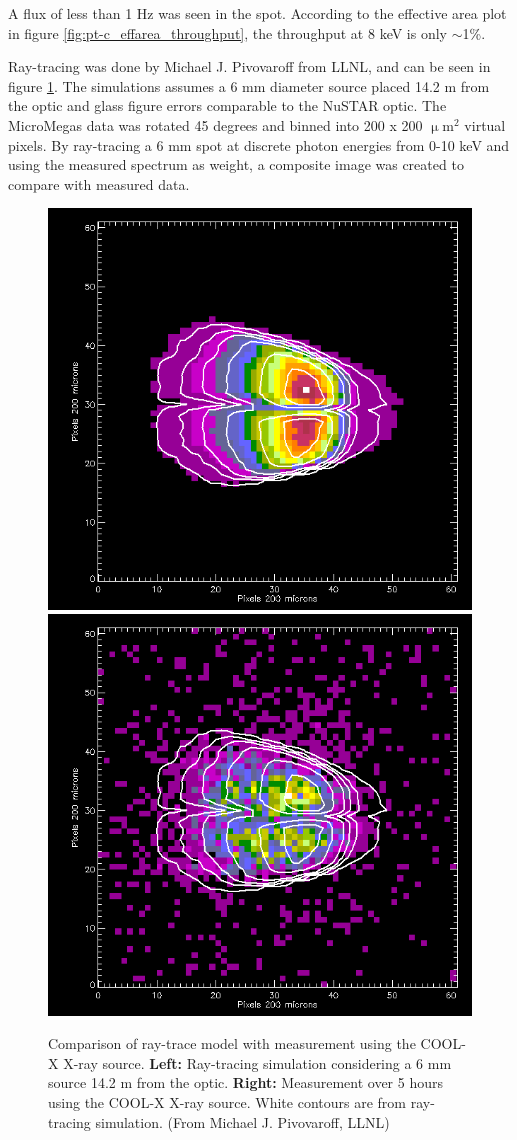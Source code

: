 A flux of less than 1 Hz was seen in the spot. According to the effective area plot in figure \ref{fig:pt-c_effarea_throughput}, the throughput at 8 keV is only $\sim$1\%.

Ray-tracing was done by Michael J. Pivovaroff from LLNL, and can be seen in figure \ref{fig:raytracing}. The simulations assumes a 6 mm diameter source placed 14.2 m from the optic and glass figure errors comparable to the NuSTAR optic. The MicroMegas data was rotated 45 degrees and binned into 200 x 200 $\upmu$m$^2$ virtual pixels. By ray-tracing a 6 mm spot at discrete photon energies from 0-10 keV and using the measured spectrum as weight, a composite image was created to compare with measured data.

\begin{figure}[htbp]
  \centering
    \includegraphics[width=0.47\linewidth]{figures/cast/raytracing1.png}
    \includegraphics[width=0.47\linewidth]{figures/cast/raytracing2.png}
  \caption{\footnotesize Comparison of ray-trace model with measurement using the COOL-X X-ray source.  \textbf{Left:} Ray-tracing simulation considering a 6 mm source 14.2 m from the optic.  \textbf{Right:} Measurement over 5 hours using the COOL-X X-ray source. White contours are from ray-tracing simulation. (From Michael J. Pivovaroff, LLNL) }
  \label{fig:raytracing}
\end{figure}

